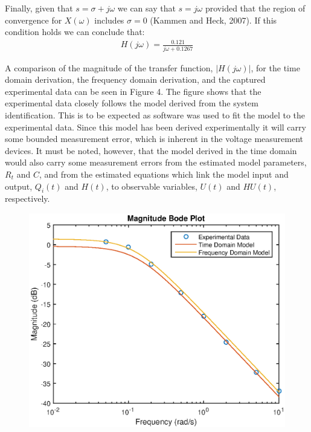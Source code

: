 \documentclass{article}
\begin{document}
Finally, given that $s = \sigma + j\omega$ we can say that $s = j\omega$ provided that the region of convergence for $X(\omega)$ includes $\sigma = 0$ (Kammen and Heck, 2007). If this condition holds we can conclude that:
\begin{align}
	H(j \omega) = \frac{0.121}{j \omega + 0.1267}
\end{align}

A comparison of the magnitude of the transfer function, $|H(j\omega)|$, for the time domain derivation, the frequency domain derivation, and the captured experimental data can be seen in Figure 4. The figure shows that the experimental data closely follows the model derived from the system identification. This is to be expected as software was used to fit the model to the experimental data. Since this model has been derived experimentally it will carry some bounded measurement error, which is inherent in the voltage measurement devices. It must be noted, however, that the model derived in the time domain would also carry some measurement errors from the estimated model parameters, $R_t$ and $C$, and from the estimated equations which link the model input and output, $Q_i(t)$ and $H(t)$, to observable variables, $U(t)$ and $HU(t)$, respectively.\\

\begin{figure}[H]
	\centering
	\includegraphics[scale=0.7]{fig3.eps}
\end{figure} 
\end{document}
